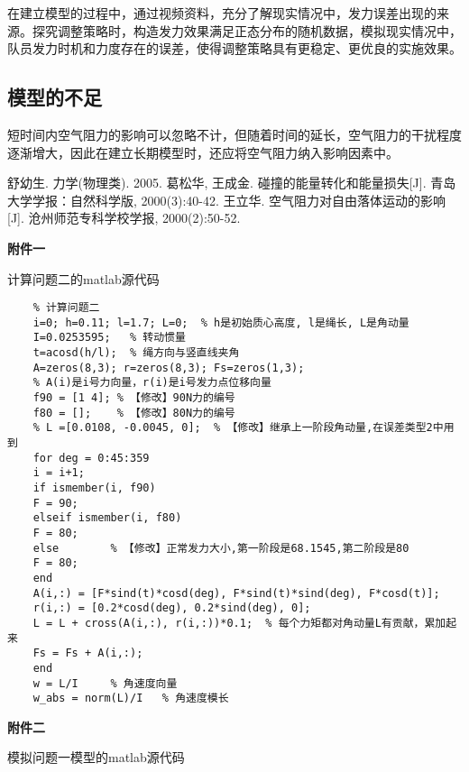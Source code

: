 \documentclass[withoutpreface,bwprint]{cumcmthesis} %
\begin{document}
在建立模型的过程中，通过视频资料，充分了解现实情况中，发力误差出现的来源。探究调整策略时，构造发力效果满足正态分布的随机数据，模拟现实情况中，队员发力时机和力度存在的误差，使得调整策略具有更稳定、更优良的实施效果。
\subsection{模型的不足}
短时间内空气阻力的影响可以忽略不计，但随着时间的延长，空气阻力的干扰程度逐渐增大，因此在建立长期模型时，还应将空气阻力纳入影响因素中。
\newpage

\begin{thebibliography}{9}%
    舒幼生. 力学(物理类). 2005.
     葛松华, 王成金. 碰撞的能量转化和能量损失[J]. 青岛大学学报：自然科学版, 2000(3):40-42.
    王立华. 空气阻力对自由落体运动的影响[J]. 沧州师范专科学校学报, 2000(2):50-52.
\end{thebibliography}


\newpage
\textbf{{\Large 附件一}}

计算问题二的matlab源代码

\begin{lstlisting}
	% 计算问题二
	i=0; h=0.11; l=1.7; L=0;  % h是初始质心高度, l是绳长, L是角动量
	I=0.0253595;   % 转动惯量
	t=acosd(h/l);  % 绳方向与竖直线夹角
	A=zeros(8,3); r=zeros(8,3); Fs=zeros(1,3);
	% A(i)是i号力向量，r(i)是i号发力点位移向量
	f90 = [1 4]; % 【修改】90N力的编号
	f80 = [];    % 【修改】80N力的编号
	% L =[0.0108, -0.0045, 0];  % 【修改】继承上一阶段角动量,在误差类型2中用到
	for deg = 0:45:359
	i = i+1;
	if ismember(i, f90) 
	F = 90;
	elseif ismember(i, f80)
	F = 80;
	else        % 【修改】正常发力大小,第一阶段是68.1545,第二阶段是80
	F = 80;
	end
	A(i,:) = [F*sind(t)*cosd(deg), F*sind(t)*sind(deg), F*cosd(t)];
	r(i,:) = [0.2*cosd(deg), 0.2*sind(deg), 0];
	L = L + cross(A(i,:), r(i,:))*0.1;  % 每个力矩都对角动量L有贡献，累加起来
	Fs = Fs + A(i,:);
	end
	w = L/I     % 角速度向量
	w_abs = norm(L)/I   % 角速度模长
\end{lstlisting}

\newpage
\textbf{{\Large 附件二}}

模拟问题一模型的matlab源代码
\end{document}

